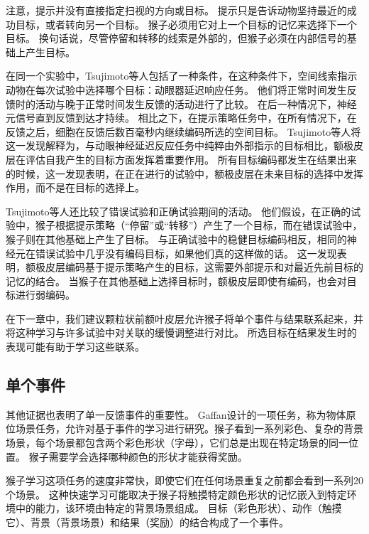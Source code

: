注意，提示并没有直接指定扫视的方向或目标。
提示只是告诉动物坚持最近的成功目标，或者转向另一个目标。
猴子必须用它对上一个目标的记忆来选择下一个目标。
换句话说，尽管停留和转移的线索是外部的，但猴子必须在内部信号的基础上产生目标。\par


在同一个实验中，Tsujimoto等人包括了一种条件，在这种条件下，空间线索指示动物在每次试验中选择哪个目标：动眼器延迟响应任务。
他们将正常时间发生反馈时的活动与晚于正常时间发生反馈的活动进行了比较。
在后一种情况下，神经元信号直到反馈到达才持续。
相比之下，在提示策略任务中，在所有情况下，在反馈之后，细胞在反馈后数百毫秒内继续编码所选的空间目标。
Tsujimoto等人将这一发现解释为，与动眼神经延迟反应任务中纯粹由外部指示的目标相比，额极皮层在评估自我产生的目标方面发挥着重要作用。
所有目标编码都发生在结果出来的时候，这一发现表明，在正在进行的试验中，额极皮层在未来目标的选择中发挥作用，而不是在目标的选择上。\par


Tsujimoto等人还比较了错误试验和正确试验期间的活动。
他们假设，在正确的试验中，猴子根据提示策略（“停留”或“转移”）产生了一个目标，而在错误试验中，猴子则在其他基础上产生了目标。
与正确试验中的稳健目标编码相反，相同的神经元在错误试验中几乎没有编码目标，如果他们真的这样做的话。
这一发现表明，额极皮层编码基于提示策略产生的目标，这需要外部提示和对最近先前目标的记忆的结合。
当猴子在其他基础上选择目标时，额极皮层即使有编码，也会对目标进行弱编码。\par


在下一章中，我们建议颗粒状前额叶皮层允许猴子将单个事件与结果联系起来，并将这种学习与许多试验中对关联的缓慢调整进行对比。
所选目标在结果发生时的表现可能有助于学习这些联系。\par




\subsection{单个事件}

其他证据也表明了单一反馈事件的重要性。
Gaffan\cite{gaffan1992amnesia}设计的一项任务，称为物体原位场景任务，允许对基于事件的学习进行研究。猴子看到一系列彩色、复杂的背景场景，每个场景都包含两个彩色形状（字母），它们总是出现在特定场景的同一位置。
猴子需要学会选择哪种颜色的形状才能获得奖励。\par


猴子学习这项任务的速度非常快，即使它们在任何场景重复之前都会看到一系列20个场景。
这种快速学习可能取决于猴子将触摸特定颜色形状的记忆嵌入到特定环境中的能力，该环境由特定的背景场景组成。
目标（彩色形状）、动作（触摸它）、背景（背景场景）和结果（奖励）的结合构成了一个事件。\par


